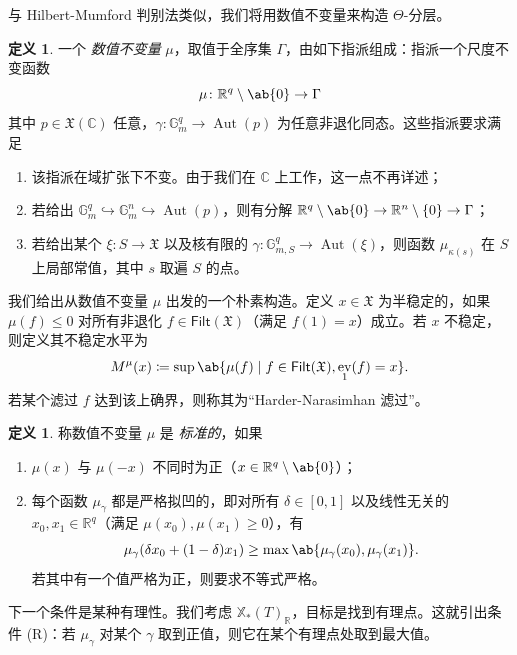 \documentclass{amsart}
\theoremstyle{definition}
\newtheorem{defn}[thm]{定义}
\theoremstyle{remark}
\theoremstyle{plain}
\theoremstyle{definition}
\theoremstyle{remark}
\newcommand{\G}{\mathbb{G}}
\newcommand{\R}{\mathbb{R}}
\newcommand{\C}{\mathbb{C}}
\newcommand{\mf}[1]{\mathfrak{#1}}
\newcommand{\ms}[1]{\mathsf{#1}}
\newcommand{\1}{\mathbf{1}}
\newcommand{\2}{\mathbf{2}}
\newcommand{\3}{\mathbf{3}}
\DeclareMathOperator{\Aut}{Aut}
\DeclareMathOperator{\ev}{ev}
\begin{document}
与 Hilbert-Mumford 判别法类似，我们将用数值不变量来构造 \(\Theta\)-分层。
\begin{defn}
    一个 \textit{数值不变量} \(\mu\)，取值于全序集 \(\Gamma\)，由如下指派组成：指派一个尺度不变函数
    \[ \mu \colon \R^q \setminus \ab\{0\} \to \Gamma \]
    其中 \(p \in \mf{X}(\C)\) 任意，\(\gamma \colon \G_m^q \to \Aut(p)\) 为任意非退化同态。这些指派要求满足
    \begin{enumerate}
        \item 该指派在域扩张下不变。由于我们在 \(\C\) 上工作，这一点不再详述；
        \item 若给出 \(\G_m^q \hookrightarrow \G_m^n \hookrightarrow \Aut(p)\)，则有分解 \(\R^q \setminus \ab\{0\} \to \R^n \setminus \{0\} \to \Gamma\)；
        \item 若给出某个 \(\xi \colon S \to \mf{X}\) 以及核有限的 \(\gamma \colon \G_{m, S}^q \to \Aut(\xi)\)，则函数 \(\mu_{\kappa(s)}\) 在 \(S\) 上局部常值，其中 \(s\) 取遍 \(S\) 的点。
    \end{enumerate}
\end{defn}

我们给出从数值不变量 \(\mu\) 出发的一个朴素构造。定义 \(x \in \mf{X}\) 为半稳定的，如果 \(\mu(f) \leq 0\) 对所有非退化 \(f \in \ms{Filt}(\mf{X})\)（满足 \(f(1) = x\)）成立。若 \(x\) 不稳定，则定义其不稳定水平为
\[ M^{\mu}(x) \coloneqq \sup \ab\{ \mu(f) \mid f \in \ms{Filt}(\mf{X}), \ev_1(f) = x\}. \]
若某个滤过 \(f\) 达到该上确界，则称其为“Harder-Narasimhan 滤过”。

\begin{defn}
    称数值不变量 \(\mu\) 是 \textit{标准的}，如果
    \begin{enumerate}
        \item \(\mu(x)\) 与 \(\mu(-x)\) 不同时为正（\(x \in \R^q \setminus \ab\{0\}\)）；
        \item 每个函数 \(\mu_{\gamma}\) 都是严格拟凹的，即对所有 \(\delta \in [0,1]\) 以及线性无关的 \(x_0, x_1 \in \R^q\)（满足 \(\mu(x_0), \mu(x_1) \geq 0\)），有 
            \[\mu_{\gamma}(\delta x_0 + (1-\delta)x_1) \geq \max\ab\{\mu_{\gamma}(x_0), \mu_{\gamma}(x_1)\}.\] 若其中有一个值严格为正，则要求不等式严格。
    \end{enumerate}
\end{defn}

下一个条件是某种有理性。我们考虑 \(\mathbb{X}_*(T)_{\R}\)，目标是找到有理点。这就引出条件 (R)：若 \(\mu_{\gamma}\) 对某个 \(\gamma\) 取到正值，则它在某个有理点处取到最大值。
\end{document}
